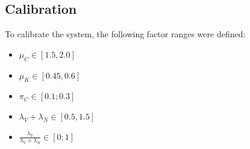 
\subsection{Calibration}
To calibrate the system, the following factor ranges were defined:
\begin{itemize}
\item $\mu_C \in [1.5, 2.0]$
\item $\mu_K \in [0.45, 0.6]$
\item $\pi_C \in [0.1; 0.3]$
\item $\lambda_V+\lambda_N  \in [0.5, 1.5]$
\item $\frac{\lambda_V}{\lambda_V+\lambda_N} \in [0;1]$
\end{itemize}
